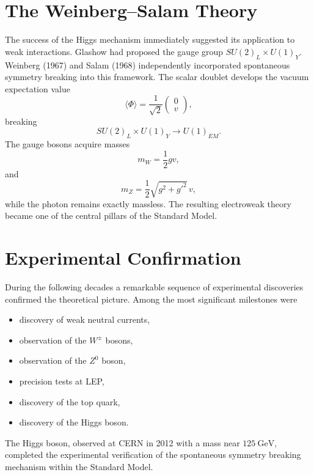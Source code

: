 \section{The Weinberg--Salam Theory}
The success of the Higgs mechanism immediately suggested its application
to weak interactions.
Glashow had proposed the gauge group $SU(2)_L \times U(1)_Y.$
Weinberg (1967) and Salam (1968) independently incorporated spontaneous
symmetry breaking into this framework.
The scalar doublet develops the vacuum expectation value
\[\langle\Phi\rangle=\frac{1}{\sqrt{2}}
\begin{pmatrix}
0\\
v
\end{pmatrix},\]
breaking
\[SU(2)_L\times U(1)_Y\longrightarrow U(1)_{EM}.\]
The gauge bosons acquire masses
\[m_W=\frac{1}{2} gv,\]
and
\[m_Z=\frac{1}{2}\sqrt{g^2+g'^2}\,v,\]
while the photon remains exactly massless.
The resulting electroweak theory became one of the central pillars of
the Standard Model.

\section{Experimental Confirmation}
During the following decades a remarkable sequence of experimental
discoveries confirmed the theoretical picture.
Among the most significant milestones were
\begin{itemize}
\item discovery of weak neutral currents,
\item observation of the $W^\pm$ bosons,
\item observation of the $Z^0$ boson,
\item precision tests at LEP,
\item discovery of the top quark,
\item discovery of the Higgs boson.
\end{itemize}
The Higgs boson, observed at CERN in 2012 with a mass near 
$ 125~\mathrm{GeV},$
completed the experimental verification of the spontaneous symmetry
breaking mechanism within the Standard Model.

